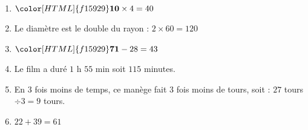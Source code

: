 \begin{Correction}
\begin{EXO}{}{}
\begin{multicols}{2}
\begin{enumerate}[itemsep=1em, label=\arabic*)]
\item \begin{minipage}[t]{\linewidth}${\color[HTML]{f15929}\boldsymbol{10}} \times 4=40$\end{minipage}
\item \begin{minipage}[t]{\linewidth}Le diamètre est le double du rayon : $2 \times 60 = 120$\end{minipage}
\item \begin{minipage}[t]{\linewidth}${\color[HTML]{f15929}\boldsymbol{71}} - 28=43$\end{minipage}
\item \begin{minipage}[t]{\linewidth}Le film a duré $1$ h $55$ min soit $115$ minutes.\end{minipage}
\item \begin{minipage}[t]{\linewidth}En $3$ fois moins de temps, ce manège fait $3$ fois moins de tours, soit : $27$ tours $\div 3=9$ tours.\end{minipage}
\item \begin{minipage}[t]{\linewidth}$22 + 39=61$\end{minipage}
\end{enumerate}
\end{multicols}

\end{EXO}

\clearpage
\end{Correction}


